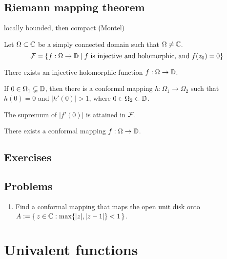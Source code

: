 \documentclass{../../large}
\begin{document}
\section{Riemann mapping theorem}


\begin{prb}
locally bounded, then compact (Montel)
\end{prb}

\begin{prb}
\end{prb}

\begin{prb}
Let $\Omega\subset\mathbb{C}$ be a simply connected domain such that $\Omega\ne\mathbb{C}$.
\[\mathcal{F}=\{f:\Omega\to\mathbb{D}\mid f\text{ is injective and holomorphic, and }f(z_0)=0\}\]
\begin{parts}
\item There exists an injective holomorphic function $f:\Omega\to\mathbb{D}$.
\item If $0\in\Omega_1\subsetneq\mathbb{D}$, then there is a conformal mapping $h:\Omega_1\to\Omega_2$ such that $h(0)=0$ and $|h'(0)|>1$, where $0\in\Omega_2\subset\mathbb{D}$.
\item The supremum of $|f'(0)|$ is attained in $\mathcal{F}$.
\item There exists a conformal mapping $f:\Omega\to\mathbb{D}$.
\end{parts}
\end{prb}


\section*{Exercises}
\begin{prb}
\end{prb}
\begin{prb}
\end{prb}

\section*{Problems}
\begin{enumerate}
\item Find a conformal mapping that maps the open unit disk onto $A:=\{\,z\in\mathbb{C}:\max\{|z|,|z-1|\}<1\,\}$.
\end{enumerate}




\chapter{Univalent functions}
\end{document}
